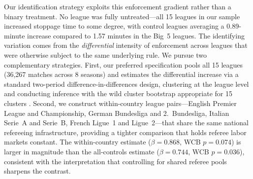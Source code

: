 Our identification strategy exploits this enforcement gradient rather than a binary treatment. No league was fully untreated---all 15 leagues in our sample increased stoppage time to some degree, with control leagues averaging a 0.89-minute increase compared to 1.57 minutes in the Big~5 leagues. The identifying variation comes from the \emph{differential} intensity of enforcement across leagues that were otherwise subject to the same underlying rule. We pursue two complementary strategies. First, our preferred specification pools all 15 leagues (36,267 matches across 8 seasons) and estimates the differential increase via a standard two-period difference-in-differences design, clustering at the league level and conducting inference with the wild cluster bootstrap appropriate for 15 clusters \citep{CameronGelbachMiller2008}. Second, we construct within-country league pairs---English Premier League and Championship, German Bundesliga and 2.~Bundesliga, Italian Serie~A and Serie~B, French Ligue~1 and Ligue~2---that share the same national refereeing infrastructure, providing a tighter comparison that holds referee labor markets constant. The within-country estimate ($\beta = 0.868$, WCB $p = 0.074$) is larger in magnitude than the all-controls estimate ($\beta = 0.744$, WCB $p = 0.036$), consistent with the interpretation that controlling for shared referee pools sharpens the contrast.

